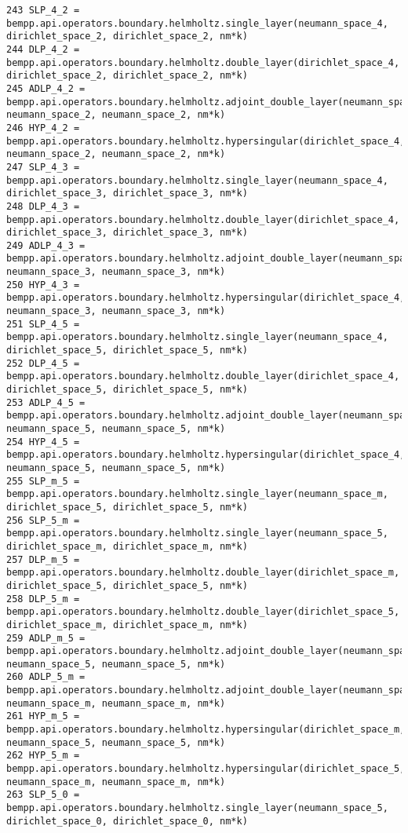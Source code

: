 \documentclass[12pt,letterpaper]{report}
\numberwithin{equation}{section}
\begin{document}
\begin{lstlisting}
243 SLP_4_2 = bempp.api.operators.boundary.helmholtz.single_layer(neumann_space_4, dirichlet_space_2, dirichlet_space_2, nm*k)
244 DLP_4_2 = bempp.api.operators.boundary.helmholtz.double_layer(dirichlet_space_4, dirichlet_space_2, dirichlet_space_2, nm*k)
245 ADLP_4_2 = bempp.api.operators.boundary.helmholtz.adjoint_double_layer(neumann_space_4, neumann_space_2, neumann_space_2, nm*k)
246 HYP_4_2 = bempp.api.operators.boundary.helmholtz.hypersingular(dirichlet_space_4, neumann_space_2, neumann_space_2, nm*k)
247 SLP_4_3 = bempp.api.operators.boundary.helmholtz.single_layer(neumann_space_4, dirichlet_space_3, dirichlet_space_3, nm*k)
248 DLP_4_3 = bempp.api.operators.boundary.helmholtz.double_layer(dirichlet_space_4, dirichlet_space_3, dirichlet_space_3, nm*k)
249 ADLP_4_3 = bempp.api.operators.boundary.helmholtz.adjoint_double_layer(neumann_space_4, neumann_space_3, neumann_space_3, nm*k)
250 HYP_4_3 = bempp.api.operators.boundary.helmholtz.hypersingular(dirichlet_space_4, neumann_space_3, neumann_space_3, nm*k)
251 SLP_4_5 = bempp.api.operators.boundary.helmholtz.single_layer(neumann_space_4, dirichlet_space_5, dirichlet_space_5, nm*k)
252 DLP_4_5 = bempp.api.operators.boundary.helmholtz.double_layer(dirichlet_space_4, dirichlet_space_5, dirichlet_space_5, nm*k)
253 ADLP_4_5 = bempp.api.operators.boundary.helmholtz.adjoint_double_layer(neumann_space_4, neumann_space_5, neumann_space_5, nm*k)
254 HYP_4_5 = bempp.api.operators.boundary.helmholtz.hypersingular(dirichlet_space_4, neumann_space_5, neumann_space_5, nm*k)
255 SLP_m_5 = bempp.api.operators.boundary.helmholtz.single_layer(neumann_space_m, dirichlet_space_5, dirichlet_space_5, nm*k)
256 SLP_5_m = bempp.api.operators.boundary.helmholtz.single_layer(neumann_space_5, dirichlet_space_m, dirichlet_space_m, nm*k)
257 DLP_m_5 = bempp.api.operators.boundary.helmholtz.double_layer(dirichlet_space_m, dirichlet_space_5, dirichlet_space_5, nm*k)
258 DLP_5_m = bempp.api.operators.boundary.helmholtz.double_layer(dirichlet_space_5, dirichlet_space_m, dirichlet_space_m, nm*k)
259 ADLP_m_5 = bempp.api.operators.boundary.helmholtz.adjoint_double_layer(neumann_space_m, neumann_space_5, neumann_space_5, nm*k)
260 ADLP_5_m = bempp.api.operators.boundary.helmholtz.adjoint_double_layer(neumann_space_5, neumann_space_m, neumann_space_m, nm*k)
261 HYP_m_5 = bempp.api.operators.boundary.helmholtz.hypersingular(dirichlet_space_m, neumann_space_5, neumann_space_5, nm*k)
262 HYP_5_m = bempp.api.operators.boundary.helmholtz.hypersingular(dirichlet_space_5, neumann_space_m, neumann_space_m, nm*k)
263 SLP_5_0 = bempp.api.operators.boundary.helmholtz.single_layer(neumann_space_5, dirichlet_space_0, dirichlet_space_0, nm*k)

\end{lstlisting}
\end{document}
